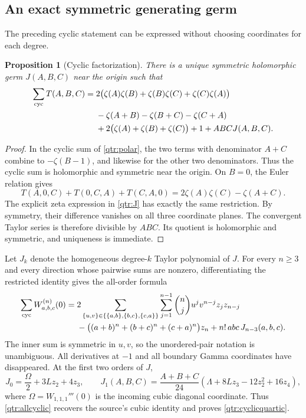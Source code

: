 \documentclass[11pt,a4paper]{article}
\numberwithin{equation}{section}
\newtheorem{proposition}[theorem]{Proposition}
\theoremstyle{definition}
\theoremstyle{remark}
\begin{document}
\subsection{An exact symmetric generating germ}

The preceding cyclic statement can be expressed without
choosing coordinates for each degree.

\begin{proposition}[Cyclic factorization]\label{qtr:factorization}
There is a unique symmetric holomorphic germ \(J(A,B,C)\)
near the origin such that
\begin{align}
 \sum_{\mathrm{cyc}}T(A,B,C)
 ={}&2\bigl(\zeta(A)\zeta(B)+\zeta(B)\zeta(C)
                              +\zeta(C)\zeta(A)\bigr)\notag\\
 &-\zeta(A+B)-\zeta(B+C)-\zeta(C+A)\notag\\
 &+2\bigl(\zeta(A)+\zeta(B)+\zeta(C)\bigr)+1
 +ABC J(A,B,C).
 \label{qtr:J}
\end{align}
\end{proposition}

\begin{proof}
In the cyclic sum of \eqref{qtr:polar}, the two terms with
denominator \(A+C\) combine to \(-\zeta(B-1)\), and likewise
for the other two denominators. Thus the cyclic sum is
holomorphic and symmetric near the origin.
On \(B=0\), the Euler relation gives
\[
 T(A,0,C)+T(0,C,A)+T(C,A,0)
                   =2\zeta(A)\zeta(C)-\zeta(A+C).
\]
The explicit zeta expression in \eqref{qtr:J} has exactly the
same restriction. By symmetry, their difference vanishes on
all three coordinate planes. The convergent Taylor series is
therefore divisible by \(ABC\). Its quotient is holomorphic
and symmetric, and uniqueness is immediate.
\end{proof}

Let \(J_k\) denote the homogeneous degree-\(k\) Taylor
polynomial of \(J\). For every \(n\ge3\) and every direction
whose pairwise sums are nonzero, differentiating the restricted
identity gives the all-order formula
\begin{align}
 \sum_{\mathrm{cyc}}W_{a,b,c}^{(n)}(0)
 ={}&2\sum_{\{u,v\}\in\{\{a,b\},\{b,c\},\{c,a\}\}}
       \sum_{j=1}^{n-1}\binom nj u^jv^{n-j}z_jz_{n-j}\notag\\
 &-\bigl((a+b)^n+(b+c)^n+(c+a)^n\bigr)z_n
 +n!\,abc\,J_{n-3}(a,b,c).
 \label{qtr:allcyclic}
\end{align}
The inner sum is symmetric in \(u,v\), so the unordered-pair
notation is unambiguous. All derivatives at \(-1\) and all
boundary Gamma coordinates have disappeared. At the first
two orders of \(J\),
\[
 J_0=\frac{\Omega}{2}+3Lz_2+4z_3,\qquad
 J_1(A,B,C)=\frac{A+B+C}{24}
                  (\Lambda+8Lz_3-12z_2^2+16z_4),
\]
where \(\Omega=W_{1,1,1}'''(0)\) is the incoming cubic
diagonal coordinate. Thus \eqref{qtr:allcyclic} recovers the
source's cubic identity and proves
\eqref{qtr:cyclicquartic}.
\end{document}
